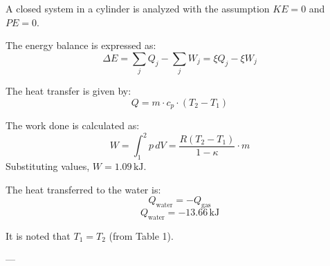 A closed system in a cylinder is analyzed with the assumption \( KE = 0 \) and \( PE = 0 \).  

The energy balance is expressed as:  
\[
\Delta E = \sum_j Q_j - \sum_j W_j = \xi Q_j - \xi W_j
\]  

The heat transfer is given by:  
\[
Q = m \cdot c_p \cdot (T_2 - T_1)
\]  

The work done is calculated as:  
\[
W = \int_1^2 p \, dV = \frac{R(T_2 - T_1)}{1 - \kappa} \cdot m
\]  
Substituting values, \( W = 1.09 \, \text{kJ} \).  

The heat transferred to the water is:  
\[
Q_{\text{water}} = -Q_{\text{gas}}
\]  
\[
Q_{\text{water}} = -13.66 \, \text{kJ}
\]  

It is noted that \( T_1 = T_2 \) (from Table 1).  

---